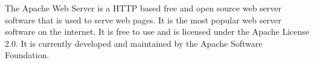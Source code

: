 The Apache Web Server is a HTTP based free and open source web server software that is used to serve web pages. It is the most popular web server software on the internet. It is free to use and is licensed under the Apache License 2.0. It is currently developed and maintained by the Apache Software Foundation. \\





















































